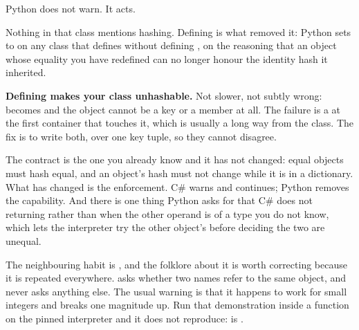 Python does not warn. It acts.


\noindent
Nothing in that class mentions hashing. Defining  is what
removed it: Python sets  to  on any class that
defines  without defining , on the
reasoning that an object whose equality you have redefined can no longer
honour the identity hash it inherited.



\begin{trapbox}
\textbf{Defining  makes your class unhashable.} Not
slower, not subtly wrong:  becomes  and the
object cannot be a  key or a  member at all. The
failure is a  at the first container that touches it, which
is usually a long way from the class. The fix is to write both, over one
key tuple, so they cannot disagree.
\end{trapbox}


\begin{csbox}
The contract is the one you already know and it has not changed: equal
objects must hash equal, and an object's hash must not change while it is
in a dictionary. What has changed is the enforcement. C\# warns and
continues; Python removes the capability. And there is one thing Python
asks for that C\# does not \dash{} returning  rather
than  when the other operand is of a type you do not know,
which lets the interpreter try the other object's  before
deciding the two are unequal.
\end{csbox}

\noindent
{}
The neighbouring habit is , and the folklore about it is worth
correcting because it is repeated everywhere.  asks whether two
names refer to the same object, and never asks anything else. The usual
warning is that it happens to work for small integers and breaks one
magnitude up. Run that demonstration inside a function on the pinned
interpreter and it does not reproduce:  is
.

